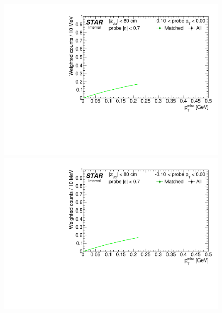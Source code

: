 \begin{figure}[h!]
{  \includegraphics[width=\linewidth,page=9]{graphics/correctionsToEff/TOF_tagAndProbe/Fitting_effVsPt_data.CPT2.pdf}\\
  \includegraphics[width=\linewidth,page=11]{graphics/correctionsToEff/TOF_tagAndProbe/Fitting_effVsPt_data.CPT2.pdf}

}
\end{figure}
